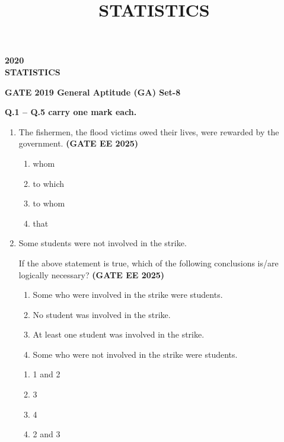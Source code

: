 \documentclass[journal,12pt,onecolumn]{IEEEtran}
\theoremstyle{remark}
\begin{document}
\title{STATISTICS}
\maketitle
\renewcommand{\thefigure}{\theenumi}
\renewcommand{\thetable}{\theenumi}
\begin {center}
\large \textbf{2020}\\
\large \textbf{STATISTICS}\\
\end{center}

\begin{center}
    \LARGE \textbf{GATE 2019 General Aptitude (GA) Set-8}
\end{center}
\textbf{Q.1 -- Q.5 carry one mark each.}
\begin{enumerate}
 \item The fishermen, \underline{\hspace{1cm}} the flood victims owed their lives, were rewarded by the government. \hfill \textbf{(GATE EE 2025)}\\

\begin{enumerate} 
    \item whom
    \item to which
    \item to whom
    \item that
\end{enumerate} 

\item Some students were not involved in the strike.

If the above statement is true, which of the following conclusions is/are logically necessary?
\hfill \textbf{(GATE EE 2025)}\\
\begin{enumerate}
    \item Some who were involved in the strike were students.
    \item No student was involved in the strike.
    \item At least one student was involved in the strike.
    \item Some who were not involved in the strike were students.
\end{enumerate}

\begin{enumerate} 
    \item 1 and 2
    \item 3
    \item 4
    \item 2 and 3
\end{enumerate}


\end{enumerate}
\end{document}
